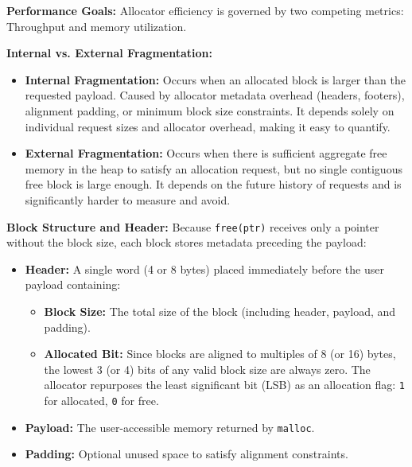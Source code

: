 \begin{definition}
    \textbf{Performance Goals:} Allocator efficiency is governed by two competing metrics: Throughput and memory utilization.
\end{definition}

\begin{definition}
    \textbf{Internal vs. External Fragmentation:}
    \begin{itemize}
        \item \textbf{Internal Fragmentation:} Occurs when an allocated block is larger than the requested payload. Caused by allocator metadata overhead (headers, footers), alignment padding, or minimum block size constraints. It depends solely on individual request sizes and allocator overhead, making it easy to quantify.
        \item \textbf{External Fragmentation:} Occurs when there is sufficient aggregate free memory in the heap to satisfy an allocation request, but no single contiguous free block is large enough. It depends on the future history of requests and is significantly harder to measure and avoid.
    \end{itemize}
\end{definition}

\begin{definition}
    \textbf{Block Structure and Header:} Because \texttt{free(ptr)} receives only a pointer without the block size, each block stores metadata preceding the payload:
    \begin{itemize}
        \item \textbf{Header:} A single word (4 or 8 bytes) placed immediately before the user payload containing:
        \begin{itemize}
            \item \textbf{Block Size:} The total size of the block (including header, payload, and padding).
            \item \textbf{Allocated Bit:} Since blocks are aligned to multiples of 8 (or 16) bytes, the lowest 3 (or 4) bits of any valid block size are always zero. The allocator repurposes the least significant bit (LSB) as an allocation flag: \texttt{1} for allocated, \texttt{0} for free.
        \end{itemize}
        \item \textbf{Payload:} The user-accessible memory returned by \texttt{malloc}.
        \item \textbf{Padding:} Optional unused space to satisfy alignment constraints.
    \end{itemize}
\end{definition}

